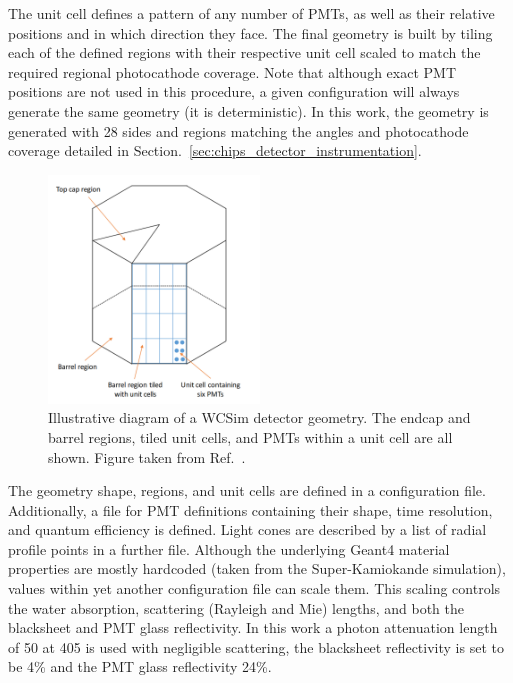 The unit cell defines a pattern of any number of PMTs, as well as their relative positions and in
which direction they face. The final geometry is built by tiling each of the defined regions with
their respective unit cell scaled to match the required regional photocathode coverage. Note that
although exact PMT positions are not used in this procedure, a given configuration will always
generate the same geometry (it is deterministic). In this work, the \chipsfive geometry is
generated with 28 sides and regions matching the angles and photocathode coverage detailed in
Section.~\ref{sec:chips_detector_instrumentation}.

\begin{figure} %
    \includegraphics[width=0.5\textwidth]{diagrams/4-chips/sim_geom.pdf}
    \caption[Illustrative diagram of a WCSim detector geometry]
    {Illustrative diagram of a WCSim detector geometry. The endcap and barrel regions, tiled unit
        cells, and PMTs within a unit cell are all shown. Figure taken from
        Ref.~\cite{blake2016}.}
    \label{fig:sim_geom}
\end{figure}

The geometry shape, regions, and unit cells are defined in a configuration file. Additionally, a
file for PMT definitions containing their shape, time resolution, and quantum efficiency is
defined. Light cones are described by a list of radial profile points in a further file. Although
the underlying Geant4 material properties are mostly hardcoded (taken from the Super-Kamiokande
simulation), values within yet another configuration file can scale them. This scaling controls
the water absorption, scattering (Rayleigh and Mie) lengths, and both the blacksheet and PMT glass
reflectivity. In this work a photon attenuation length of \unit{50}{} at
\unit{405}{} is used with negligible scattering, the blacksheet reflectivity is set to
be 4\% and the PMT glass reflectivity 24\%.

